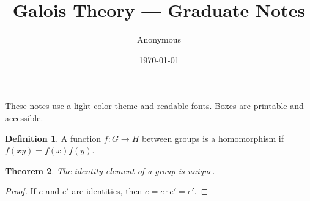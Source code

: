 \documentclass[12pt]{article}
\title{Galois Theory --- Graduate Notes}
\author{Anonymous}
\date{\today}
\numberwithin{equation}{section}
\newtheorem{theorem}{Theorem}[section]
\theoremstyle{definition}
\newtheorem{definition}[theorem]{Definition}
\theoremstyle{remark}
\begin{document}
\maketitle
\tableofcontents



\begin{infobox}
  These notes use a light color theme and readable fonts. Boxes are printable and accessible.
\end{infobox}

\begin{defbox}
  \begin{definition}
    A function $f:G\to H$ between groups is a homomorphism if $f(xy)=f(x)f(y)$.
  \end{definition}
\end{defbox}

\begin{thmbox}
  \begin{theorem}
    The identity element of a group is unique.
  \end{theorem}
  \begin{proof}
    If $e$ and $e'$ are identities, then $e=e\cdot e'=e'$.
  \end{proof}
\end{thmbox}















\clearpage
\printbibliography
\end{document}
